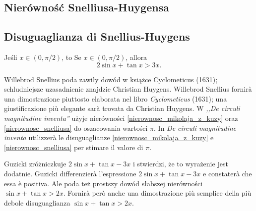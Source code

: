 %

\subsection{Nierówność Snelliusa-Huygensa} %
\subsection{Disuguaglianza di Snellius-Huygens} %

\begin{proposition}
    Jeśli $x \in (0, \pi/2)$, to %
    Se $x \in (0, \pi/2)$, allora %
    \begin{equation}
        2 \sin x + \tan x > 3x.
        \label{nierownosc_snelliusa}
    \end{equation}
\end{proposition}

Willebrod Snellius poda zawiły dowód w książce Cyclometicus (1631); schludniejsze uzasadnienie znajdzie Christian Huygens. %
Willebrod Snellius fornirà una dimostrazione piuttosto elaborata nel libro \emph{Cyclometicus} (1631); una giustificazione più elegante sarà trovata da Christian Huygens. %
%
%
W \emph{,,De circuli magnitudine inventa''} użyje nierówności \ref{nierownosc_mikolaja_z_kuzy} oraz \ref{nierownosc_snelliusa} do oszacowania wartości $\pi$. %
In \emph{De circuli magnitudine inventa} utilizzerà le disuguaglianze \ref{nierownosc_mikolaja_z_kuzy} e \ref{nierownosc_snelliusa} per stimare il valore di $\pi$. %

Guzicki \cite[s. 391]{guzicki_2021} zróżniczkuje $2 \sin x + \tan x - 3x$ i stwierdzi, że to wyrażenie jest dodatnie. %
Guzicki \cite[p. 391]{guzicki_2021} differenzierà l'espressione $2 \sin x + \tan x - 3x$ e constaterà che essa è positiva. %
Ale poda też prostszy dowód słabszej nierówności $\sin x + \tan x > 2x$. %
Fornirà però anche una dimostrazione più semplice della più debole disuguaglianza $\sin x + \tan x > 2x$. %

%